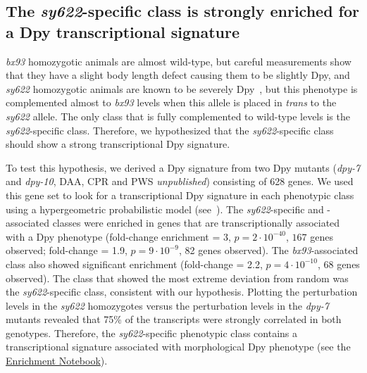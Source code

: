 \documentclass[10pt, twocolumn]{article}
\newcommand{\gene}[1]{\mbox{\emph{#1}}}
\begin{document}
\subsection*{The \emph{sy622}-specific class is strongly enriched for a Dpy
             transcriptional signature}
\emph{bx93} homozygotic animals are almost wild-type, but careful measurements
show that they have a slight body length defect causing them to be slightly Dpy,
and \emph{sy622} homozygotic animals are known to be severely
Dpy~\cite{Moghal2003}, but this phenotype is complemented almost to \emph{bx93}
levels when this allele is placed in \emph{trans} to the \emph{sy622} allele.
The only class that is fully complemented to wild-type levels is the
\emph{sy622}-specific class. Therefore, we hypothesized that the
\emph{sy622}-specific class should show a strong transcriptional Dpy signature.

To test this hypothesis, we derived a Dpy signature from two Dpy mutants
(\gene{dpy-7} and \gene{dpy-10}, DAA, CPR and PWS \emph{unpublished}) consisting
of 628 genes. We used this gene set to look for a transcriptional Dpy signature
in each phenotypic class using a hypergeometric probabilistic model
(see~). The \emph{sy622}-specific and
-associated classes were enriched in genes that are transcriptionally associated
with a Dpy phenotype (fold-change enrichment = 3, $p=2\cdot 10^{-40}$,
$167$ genes observed; fold-change = 1.9, $p=9\cdot10^{-9}$, 82 genes observed).
The \emph{bx93}-associated class also showed significant
enrichment (fold-change = 2.2, $p=4\cdot10^{-10}$, 68 genes observed). The class
that showed the most extreme deviation from random was the \emph{sy622}-specific
class, consistent with our hypothesis. Plotting the perturbation levels in the
\emph{sy622} homozygotes versus the perturbation levels in the \emph{dpy-7}
mutants revealed that 75\% of the transcripts were strongly correlated in both
genotypes.
Therefore, the \emph{sy622}-specific phenotypic class contains a transcriptional
signature associated with morphological Dpy phenotype (see the
\href{https://wormlabcaltech.github.io/med-cafe/notebook/enrichment.html}{
Enrichment Notebook}).
\end{document}
